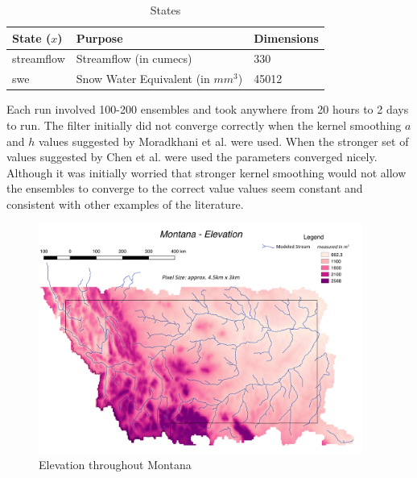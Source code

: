 \begin{table}[]
\caption{States} 
\begin{tabular}{lll}
State ($x$) & Purpose                              & Dimensions  \\ \hline
streamflow  & Streamflow (in cumecs)               & 330   \\
swe         & Snow Water Equivalent  (in $mm^{3}$) & 45012
\end{tabular}
\label{tab:states}
\end{table}

Each run involved 100-200 ensembles and took anywhere from 20 hours to 2 days to run. The filter initially did not converge correctly when the kernel smoothing $a$ and $h$ values suggested by Moradkhani et al. were used. When the stronger set of values suggested by Chen et al. \cite{Chen2008} were used the parameters converged nicely. Although it was initially worried that stronger kernel smoothing would not allow the ensembles to converge to the correct value values seem constant and consistent with other examples of the literature.


\begin{figure}[h]
    \centering
    \includegraphics[width=0.95\textwidth]{elevation}
    \caption{Elevation throughout Montana}
    \label{fig:elevation}
\end{figure}

